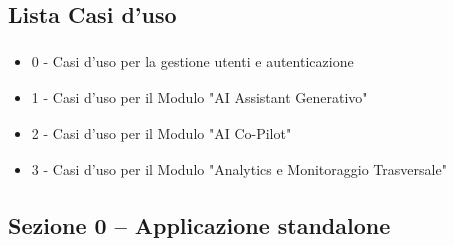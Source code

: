 ﻿\documentclass[a4paper,11pt]{article}
\newcommand{\UCPrefix}{0}
\begin{document}
\subsection{Lista Casi d'uso\textsubscript{}}

\begin{itemize}
    \item 0 - Casi d'uso\textsubscript{} per la gestione utenti e autenticazione
    \item 1 - Casi d'uso\textsubscript{} per il Modulo\textsubscript{} "AI Assistant\textsubscript{} Generativo"
    \item 2 - Casi d'uso\textsubscript{} per il Modulo\textsubscript{} "AI Co-Pilot\textsubscript{}"
    \item 3 - Casi d'uso\textsubscript{} per il Modulo\textsubscript{} "Analytics e Monitoraggio Trasversale\textsubscript{}"
\end{itemize}


\subsection{Sezione 0 – Applicazione standalone}

\renewcommand{\UCPrefix}{0}
\end{document}
